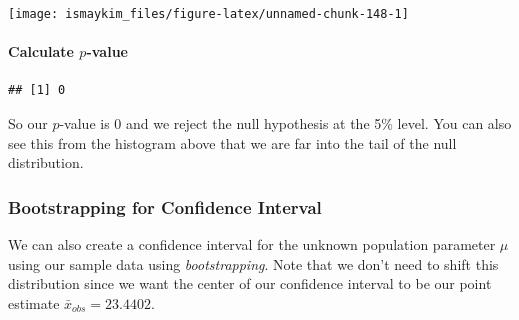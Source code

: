 \documentclass[]{tufte-book}
\newenvironment{Shaded}{\begin{snugshade}}{\end{snugshade}}
\newcommand{\KeywordTok}[1]{\textcolor[rgb]{0.13,0.29,0.53}{\textbf{{#1}}}}
\newcommand{\DataTypeTok}[1]{\textcolor[rgb]{0.13,0.29,0.53}{{#1}}}
\newcommand{\DecValTok}[1]{\textcolor[rgb]{0.00,0.00,0.81}{{#1}}}
\newcommand{\StringTok}[1]{\textcolor[rgb]{0.31,0.60,0.02}{{#1}}}
\newcommand{\OtherTok}[1]{\textcolor[rgb]{0.56,0.35,0.01}{{#1}}}
\newcommand{\NormalTok}[1]{{#1}}
\begin{document}
\begin{center}\texttt{[image: ismaykim\_files/figure-latex/unnamed-chunk-148-1]} \end{center}

\paragraph{\texorpdfstring{Calculate
\(p\)-value}{Calculate p-value}}\label{calculate-p-value}

\begin{Shaded}
\end{Shaded}

\begin{verbatim}
## [1] 0
\end{verbatim}

So our \(p\)-value is 0 and we reject the null hypothesis at the 5\%
level. You can also see this from the histogram above that we are far
into the tail of the null distribution.

\subsubsection{Bootstrapping for Confidence
Interval}\label{bootstrapping-for-confidence-interval}

We can also create a confidence interval for the unknown population
parameter \(\mu\) using our sample data using \emph{bootstrapping}. Note
that we don't need to shift this distribution since we want the center
of our confidence interval to be our point estimate
\(\bar{x}_{obs} = 23.4402\).

\begin{Shaded}
\end{Shaded}
\end{document}
